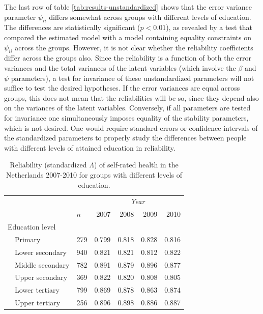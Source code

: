 \documentclass[a4paper,11pt]{article}
\newcommand{\0}{\boldsymbol{0}}
\begin{document}
The last row of table \ref{tab:results-unstandardized} shows that the error variance parameter $\psi_{ii}$ 
differs somewhat across groups with different levels of education. The differences are statistically
significant ($p < 0.01$), as revealed by a test that compared the estimated model with a model 
containing equality constraints on $\psi_{ii}$ across the groups. However, it is not clear whether 
the reliability coefficients differ across the groups also.
Since the reliability is a function of both the error variances and the total variances of the latent variables (which involve the 
$\beta$ and $\psi$ parameters), a test for invariance of these unstandardized parameters will not suffice to test the desired hypotheses. 
If the error variances are equal across groups, this does not mean that the reliabilities will be so, since they depend also on the
variances of the latent variables. Conversely, if all parameters are tested for invariance one simultaneously imposes equality of the
stability parameters, which is not desired.
One would require standard errors or confidence intervals of the standardized parameters to properly study the differences between people with different levels of attained education in reliability.



\begin{table}[bth]
\begin{center}\begin{small}
\begin{tabular}{lllrrrr}  \hline  \hline
&&&  \multicolumn{4}{c}{\emph{Year}}\\\cline{4-7}
&&$n$& 2007&2008&2009&2010\\
  \hline
  \multicolumn{2}{l}{Education level}\\
& Primary	   & 279  & 0.799 & 0.818 & 0.828 & 0.816 \\ 
& Lower secondary  & 940  & 0.821 & 0.821 & 0.812 & 0.822 \\ 
& Middle secondary & 782  & 0.891 & 0.879 & 0.896 & 0.877 \\ 
& Upper secondary  & 369  & 0.822 & 0.820 & 0.808 & 0.805 \\ 
& Lower tertiary   & 799  & 0.869 & 0.878 & 0.863 & 0.874 \\ 
& Upper tertiary   & 256  & 0.896 & 0.898 & 0.886 & 0.887 \\ 
  \hline     \hline
\end{tabular}
\caption{Reliability (standardized $\Lambda$) of self-rated health in the Netherlands 2007-2010 for groups with different levels of education.}\label{tab:first-results}\end{small}
\end{center}
\end{table}
\end{document}
